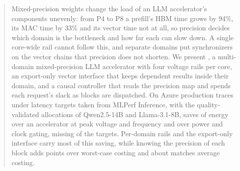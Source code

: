 \begin{abstract}
Mixed-precision weights change the load of an LLM accelerator's components unevenly: from P4 to P8 a prefill's HBM time grows by 94\%, its MAC time by 33\% and its vector time not at all, so precision decides which domain is the bottleneck and how far each can slow down.
A single core-wide rail cannot follow this, and separate domains put synchronizers on the vector chains that precision does not shorten.
We present \sys{}, a multi-domain mixed-precision LLM accelerator with four voltage rails per core, an export-only vector interface that keeps dependent results inside their domain, and a causal controller that reads the precision map and spends each request's slack as blocks are dispatched.
On Azure production traces under latency targets taken from MLPerf Inference, with the quality-validated allocations of Qwen2.5-14B and Llama-3.1-8B, \sys{} saves  of energy over an accelerator at peak voltage and frequency and  over power and clock gating, missing  of the targets.
Per-domain rails and the export-only interface carry most of this saving, while knowing the precision of each block adds  points over worst-case costing and about matches average costing.
\end{abstract}
